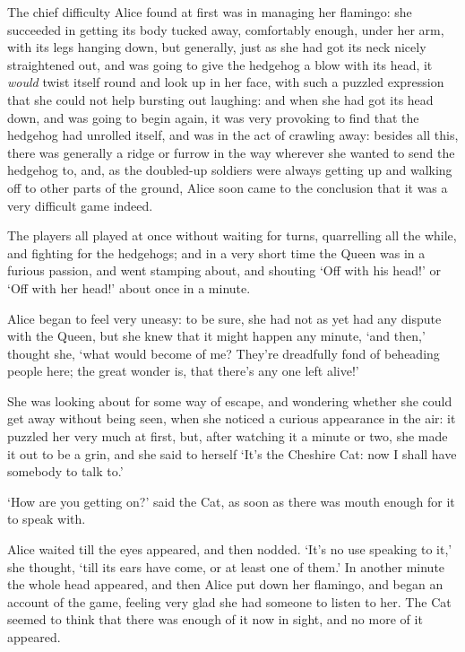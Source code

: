   The chief difficulty Alice found at first was in managing her
flamingo:  she succeeded in getting its body tucked away,
comfortably enough, under her arm, with its legs hanging down,
but generally, just as she had got its neck nicely straightened
out, and was going to give the hedgehog a blow with its head, it
{\it would} twist itself round and look up in her face, with such a
puzzled expression that she could not help bursting out laughing:
and when she had got its head down, and was going to begin again,
it was very provoking to find that the hedgehog had unrolled
itself, and was in the act of crawling away:  besides all this,
there was generally a ridge or furrow in the way wherever she
wanted to send the hedgehog to, and, as the doubled-up soldiers
were always getting up and walking off to other parts of the
ground, Alice soon came to the conclusion that it was a very
difficult game indeed.

  The players all played at once without waiting for turns,
quarrelling all the while, and fighting for the hedgehogs; and in
a very short time the Queen was in a furious passion, and went
stamping about, and shouting `Off with his head!' or `Off with
her head!' about once in a minute.

  Alice began to feel very uneasy:  to be sure, she had not as
yet had any dispute with the Queen, but she knew that it might
happen any minute, `and then,' thought she, `what would become of
me?  They're dreadfully fond of beheading people here; the great
wonder is, that there's any one left alive!'

  She was looking about for some way of escape, and wondering
whether she could get away without being seen, when she noticed a
curious appearance in the air:  it puzzled her very much at
first, but, after watching it a minute or two, she made it out to
be a grin, and she said to herself `It's the Cheshire Cat:  now I
shall have somebody to talk to.'

  `How are you getting on?' said the Cat, as soon as there was
mouth enough for it to speak with.

  Alice waited till the eyes appeared, and then nodded.  `It's no
use speaking to it,' she thought, `till its ears have come, or at
least one of them.'  In another minute the whole head appeared,
and then Alice put down her flamingo, and began an account of the
game, feeling very glad she had someone to listen to her.  The
Cat seemed to think that there was enough of it now in sight, and
no more of it appeared.

